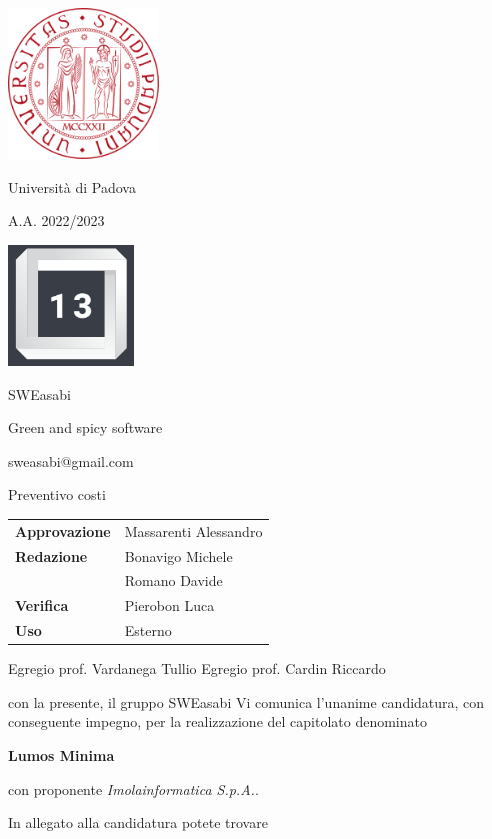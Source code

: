 \documentclass{article}
\begin{document}
\begin{center}
    
    \includegraphics[width=0.3\textwidth]{immagini/logo_unipd.png}

    Università di Padova
    
    A.A. 2022/2023
    
    \vspace{4cm}

    \includegraphics[width=0.25\textwidth]{immagini/logo_13.png}
    
    \Large SWEasabi

    \tiny Green and spicy software

    \small sweasabi@gmail.com
        
    \vspace{2cm}

    \Huge Preventivo costi
        
    \vspace{2cm}
    
    \normalsize
    \begin{center}
        \begin{tabularx}{7cm}{l | X}            
            \textbf{Approvazione} & Massarenti Alessandro\\
            \textbf{Redazione} & Bonavigo Michele \\
            & Romano Davide\\
            \textbf{Verifica} & Pierobon Luca\\
            \hline
            \textbf{Uso} & Esterno\\
        \end{tabularx}
    \end{center}
        
\end{center}

\newpage

Egregio prof. Vardanega Tullio
Egregio prof. Cardin Riccardo

con la presente, il gruppo SWEasabi Vi comunica l'unanime candidatura, con conseguente impegno, per la realizzazione del capitolato denominato

\begin{center}
    \textbf{Lumos Minima}
\end{center}

con proponente \textit{Imolainformatica S.p.A.}.

In allegato alla candidatura potete trovare 
\end{document}
